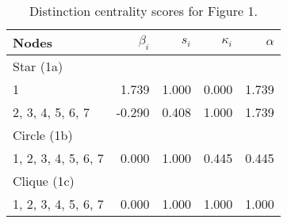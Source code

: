\begin{table}
\centering
\caption{\label{tab:star}Distinction centrality scores for Figure 1.}
\centering
\begin{tabular}[t]{lrrrr}
Nodes & $\beta_i$ & $s_i$ & $\kappa_i$ & $\alpha$\\
\toprule
\midrule
Star (1a)\\
1 & 1.739 & 1.000 & 0.000 & 1.739\\
2, 3, 4, 5, 6, 7 & -0.290 & 0.408 & 1.000 & 1.739\\
\midrule
\midrule
Circle (1b)\\
1, 2, 3, 4, 5, 6, 7 & 0.000 & 1.000 & 0.445 & 0.445\\
\midrule
\midrule
Clique (1c)\\
1, 2, 3, 4, 5, 6, 7 & 0.000 & 1.000 & 1.000 & 1.000\\
\bottomrule
\bottomrule
\end{tabular}
\end{table}
